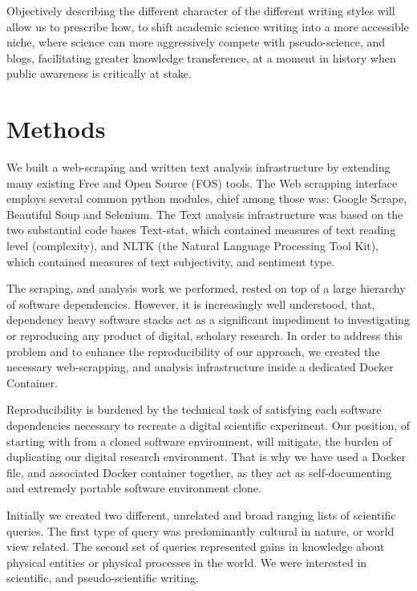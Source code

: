 \documentclass{clv3}
\begin{document}
Objectively describing the different character of the different writing styles will allow us to prescribe how, to shift academic science writing into a more accessible niche, where science can more aggressively compete with pseudo-science, and blogs, facilitating greater knowledge transference, at a moment in history when public awareness is critically at stake.


\section{Methods}

We built a web-scraping and written text analysis infrastructure by extending many existing Free and Open Source (FOS) tools. The Web scrapping interface employs several common python modules, chief among those was: Google Scrape, Beautiful Soup and Selenium. The Text analysis infrastructure was based on the two substantial code bases Text-stat, which contained measures of text reading level (complexity), and NLTK (the Natural Language Processing Tool Kit), which contained measures of text subjectivity, and sentiment type.

The scraping, and analysis work we performed, rested on top of a large hierarchy of software dependencies. However, it is increasingly well understood, that, dependency heavy software stacks act as a significant impediment to investigating or reproducing any product of digital, scholary research. In order to address this problem and to enhance the reproducibility of our approach, we created the necessary web-scrapping, and analysis infrastructure inside a dedicated Docker Container.

Reproducibility is burdened by the technical task of satisfying each software dependencies necessary to recreate a digital scientific experiment. Our position, of starting with from a cloned software environment, will mitigate, the burden of duplicating our digital research environment. That is why we have used a Docker file, and associated Docker container together, as they act as self-documenting and extremely portable software environment clone.

Initially we created two different, unrelated and broad ranging lists of scientific queries. The first type of query was predominantly cultural in nature, or world view related. The second set of queries represented gains in knowledge about physical entities or physical processes in the world. We were interested in scientific, and pseudo-scientific writing.
\end{document}
